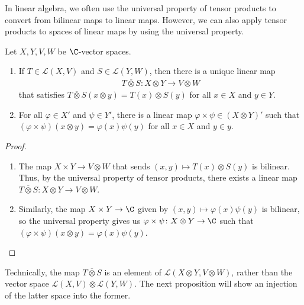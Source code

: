 In linear algebra, we often use the universal property of tensor products to convert from bilinear maps to linear maps. However, we can also apply tensor products to spaces of linear maps by using the universal property.
\begin{proposition}
  Let $X,Y,V,W$ be $\C$-vector spaces.
  \begin{enumerate}[(1)]
    \item If $T\in \mathcal{L}\left( X,V \right)$ and $S\in \mathcal{L}\left( Y,W \right)$, then there is a unique linear map
      \begin{align*}
        T\overline{\otimes} S \colon X\otimes Y \rightarrow V\otimes W
      \end{align*}
      that satisfies $T\overline{\otimes} S\left( x\otimes y \right) = T\left( x \right)\otimes S\left( y \right)$ for all $x\in X$ and $y\in Y$.
    \item For all $\varphi\in X'$ and $\psi\in Y'$, there is a linear map $\varphi\times\psi \in \left( X\otimes Y \right)'$ such that $\left( \varphi\times\psi \right)\left( x\otimes y \right) = \varphi\left( x \right)\psi\left( y \right)$ for all $x\in X$ and $y\in y$.
  \end{enumerate}
\end{proposition}
\begin{proof}\hfill
  \begin{enumerate}[(1)]
    \item The map $X\times Y \rightarrow V\otimes W$ that sends $\left( x,y \right)\mapsto T\left( x \right)\otimes S\left( y \right)$ is bilinear. Thus, by the universal property of tensor products, there exists a linear map $T \overline{\otimes} S \colon X\otimes Y \rightarrow V\otimes W$.
    \item Similarly, the map $X\times Y \rightarrow \C$ given by $\left( x,y \right)\mapsto \varphi(x)\psi(y)$ is bilinear, so the universal property gives us $\varphi\times\psi\colon X\otimes Y \rightarrow \C$ such that $\left( \varphi\times \psi \right)\left( x\otimes y \right) = \varphi\left( x \right)\psi\left( y \right)$.
  \end{enumerate}
\end{proof}
\begin{remark}
Technically, the map $T\overline{\otimes} S$ is an element of $\mathcal{L}\left( X\otimes Y,V\otimes W \right)$, rather than the vector space $\mathcal{L}\left( X,V \right)\otimes \mathcal{L}\left( Y,W \right)$. The next proposition will show an injection of the latter space into the former.
\end{remark}
